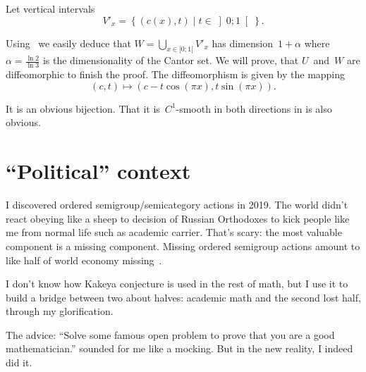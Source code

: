 \documentclass[oneside,draft]{amsart}
\newcommand{\setcond}[2]{\left\{#1\mid#2\right\}}
\begin{document}
Let vertical intervals \[ V'_x = \setcond{(c(x), t)}{t\in\left]0;1\right[}. \]

Using~\cite{189275} we easily deduce that $W=\bigcup_{x\in[0;1[}V'_x$ has dimension~$1+\alpha$ where $\alpha=\frac{\ln 2}{\ln 3}$ is the dimensionality of the Cantor set. We will prove, that $U$~and~$W$ are diffeomorphic to finish the proof. The diffeomorphism is given by the mapping \[ (c,t) \mapsto (c-t\cos(\pi x), t\sin(\pi x)). \]

It is an obvious bijection. That it is~$C^1$-smooth in both directions in is also obvious.

\section{``Political'' context}

I discovered ordered semigroup/semicategory actions in 2019. The world didn't react obeying like a sheep to decision of Russian Orthodoxes to kick people like me from normal life such as academic carrier. That's scary: the most valuable component is a missing component. Missing ordered semigroup actions amount to like half of world economy missing~\cite{osa-important}.

I don't know how Kakeya conjecture is used in the rest of math, but I use it to build a bridge between two about halves: academic math and the second lost half, through my glorification.

The advice: ``Solve some famous open problem to prove that you are a good mathematician.'' sounded for me like a mocking. But in the new reality, I indeed did it.



\end{document}

